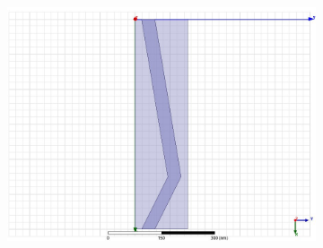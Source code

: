 \documentclass[oneside,11pt,book]{book}
\begin{document}
\begin{figure}
\begin{subfigure}[b]{0.3\linewidth}
\caption{}
\end{subfigure}
\begin{subfigure}[b]{0.3\linewidth}
\centering\includegraphics[width=\linewidth]{temp-bandgaps/150xOffset.jpg}
\caption{}
\end{subfigure}


\end{figure}
\end{document}
